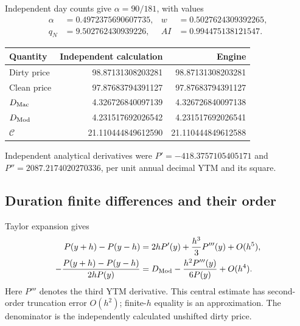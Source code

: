 \documentclass[12pt,a4paper]{article}
\begin{document}
Independent day counts give $\alpha=90/181$, with values
\begin{align*}
 \alpha&=0.4972375690607735,& w&=0.5027624309392265,\\
 q_N&=9.502762430939226,& AI&=0.994475138121547.
\end{align*}
\begin{center}\small
\begin{tabular}{@{}lrr@{}}
\toprule
Quantity & Independent calculation & Engine\\
\midrule
Dirty price & 98.87131308203281 & 98.87131308203281\\
Clean price & 97.87683794391127 & 97.87683794391127\\
$D_{\rm Mac}$ & 4.326726840097139 & 4.326726840097138\\
$D_{\rm Mod}$ & 4.231517692026542 & 4.231517692026541\\
$\mathcal C$ & 21.110444849612590 & 21.110444849612588\\
\bottomrule
\end{tabular}
\end{center}
Independent analytical derivatives were $P'=-418.3757105405171$ and
$P''=2087.2174020270336$, per unit annual decimal YTM and its square.

\subsection{Duration finite differences and their order}
Taylor expansion gives
\begin{align}
 P(y+h)-P(y-h)&=2hP'(y)+\frac{h^3}{3}P'''(y)+O(h^5),\\
 -\frac{P(y+h)-P(y-h)}{2hP(y)}
 &=D_{\rm Mod}-\frac{h^2P'''(y)}{6P(y)}+O(h^4).
\end{align}
Here $P'''$ denotes the third YTM derivative. This central estimate has
second-order truncation error $O(h^2)$; finite-$h$ equality is an approximation.
The denominator is the independently calculated unshifted dirty price.
\end{document}
